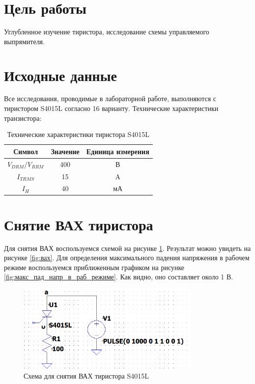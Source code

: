 \section*{Цель работы}

Углубленное изучение тиристора, исследование схемы
управляемого выпрямителя.



\section*{Исходные данные}

Все исследования, проводимые в лабораторной работе, выполняются с 
тиристором S4015L согласно 16 варианту.
Технические характеристики транзистора:

\begin{table}[h]
\centering
\caption{Технические характеристики тиристора S4015L}
\label{tab:datasheet}
\begin{tabular}{|c|c|c|}
\hline
\textbf{Символ} & \textbf{Значение} & \textbf{Единица измерения}\\
\hline
$V_{DRM}/V_{RRM}$ & 400 & В\\
\hline
$I_{TRMS}$ & 15 & A\\
\hline
$I_{H}$ & 40 & мА\\
\hline
\end{tabular}
\end{table}


\section*{Снятие ВАХ тиристора}

Для снятия ВАХ воспользуемся схемой на рисунке \ref{fig:вах_схема}.
Результат можно увидеть на рисунке \ref{fig:вах}. Для определения максимального
падения напряжения в рабочем режиме воспользуемся приближенным графиком на рисунке
\ref{fig:макс_пад_напр_в_раб_режиме}. Как видно, оно составляет около 1 В.

\begin{figure}[H]
    \centering
    \includegraphics[width=0.8\textwidth]{figs/вах_схема.png}
    \caption{Схема для снятия ВАХ тиристора S4015L}
    \label{fig:вах_схема}
\end{figure}

